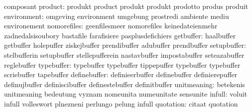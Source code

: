                                   composant
                         product: produkt                          product
                                  produkt                          produkt
                                  prodotto                         produs
                                  produit
                     environment: omgeving                         environment
                                  umgebung                         prostredi
                                  ambiente                         mediu
                                  environement
                     nomorefiles: geenfilesmeer                    nomorefiles
                                  keinedateienmehr                 zadnedalsisoubory
                                  bastafile                        farafisiere
                                  pasplusdefichiers
                       getbuffer: haalbuffer                       getbuffer
                                  holepuffer                       ziskejbuffer
                                  prendibuffer                     adubuffer
                                  prendbuffer
                     setupbuffer: stelbufferin                     setupbuffer
                                  stellepufferein                  nastavbuffer
                                  impostabuffer                    seteazabuffer
                                  reglebuffer
                      typebuffer: typebuffer                       typebuffer
                                  tippepuffer                      typebuffer
                                  typebuffer                       scriebuffer
                                  tapebuffer
                    definebuffer: definieerbuffer                  definebuffer
                                  definierepuffer                  definujbuffer
                                  definiscibuffer                  definestebuffer
                                  definitbuffer
                     unitmeaning: betekenis                        unitmeaning
                                  bedeutung                        vyznam
                                  nomeunita                        numeunitate
                                  sensunite
                          infull: voluit                           infull
                                  volleswort                       plnezneni
                                  perlungo                         pelung
                                  infull
                       quotation: citaat                           quotation
